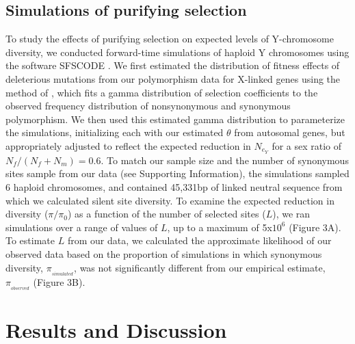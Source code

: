\documentclass[9pt,twocolumn,twoside]{gsajnl}
\begin{document}
\subsection*{Simulations of purifying selection}
To study the effects of purifying selection on expected levels of Y-chromosome diversity, we conducted forward-time simulations of haploid Y chromosomes using the software SFSCODE \citep{hernandez2008flexible}. We first estimated the distribution of fitness effects of deleterious mutations from our polymorphism data for X-linked genes using the method of \citep{keightley2007joint}, which fits a gamma distribution of selection coefficients to the observed frequency distribution of nonsynonymous and synonymous polymorphism. We then used this estimated gamma distribution to parameterize the simulations, initializing each with our estimated $\theta$ from autosomal genes, but appropriately adjusted to reflect the expected reduction in $N_{e}_{Y}$ for a sex ratio of $N_{f}/(N_{f}+N_{m})=0.6$. To match our sample size and the number of synonymous sites sample from our data (see Supporting Information), the simulations sampled 6 haploid chromosomes, and contained 45,331bp of linked neutral sequence from which we calculated silent site diversity. To examine the expected reduction in diversity ($\pi/\pi_{0}$) as a function of the number of selected sites ($L$), we ran simulations over a range of values of $L$, up to a maximum of 5x$10^{6}$ (Figure 3A). To estimate $L$ from our data, we calculated the approximate likelihood of our observed data based on the proportion of simulations in which synonymous diversity, $\pi__{simulated}$, was not significantly different from our empirical estimate, $\pi__{observed}$ (Figure 3B).

\section*{Results and Discussion}
\end{document}
